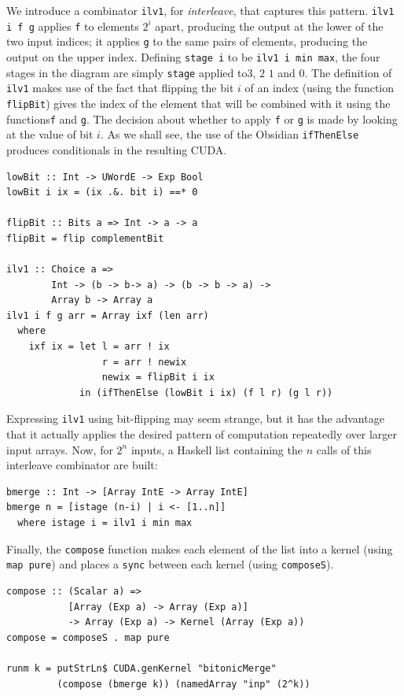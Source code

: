 We introduce a combinator {\tt ilv1}, for {\em interleave}, that captures this pattern.
{\tt ilv1 i f g} applies {\tt f} to elements {\small $2^i$} apart,
producing the output at the lower of the two input indices; it applies {\tt g}
to the same pairs of elements, producing the output on the upper index.
Defining {\tt stage i} to be {\tt ilv1 i min max},
the four stages in the diagram are simply
{\tt stage} applied to{\small  $3$, $2$ $1$} and {\small $0$}.
The definition of {\tt ilv1} makes use of the fact that
flipping the bit $i$ of an index (using
the function {\tt flipBit}) gives the index of the element
that will be combined with it using the functions{\tt f} and {\tt g}.
The decision about whether to apply {\tt f} or {\tt g} is made
by looking at the value of bit $i$.
As we shall see, the use of the Obsidian {\tt ifThenElse}
produces conditionals in the resulting CUDA.
\begin{codesize}
\begin{verbatim}
lowBit :: Int -> UWordE -> Exp Bool
lowBit i ix = (ix .&. bit i) ==* 0

flipBit :: Bits a => Int -> a -> a
flipBit = flip complementBit

ilv1 :: Choice a => 
        Int -> (b -> b-> a) -> (b -> b -> a) -> 
        Array b -> Array a
ilv1 i f g arr = Array ixf (len arr)
  where
    ixf ix = let l = arr ! ix
                 r = arr ! newix
                 newix = flipBit i ix
             in (ifThenElse (lowBit i ix) (f l r) (g l r))
\end{verbatim}
\end{codesize}
\noindent
Expressing {\tt ilv1} using bit-flipping may seem strange, but it has
the advantage that it actually applies the desired pattern of
computation repeatedly over larger input arrays.
Now, for {\small $2^n$} inputs, a Haskell list containing the $n$ calls
of this interleave combinator are built:
\begin{codesize}
\begin{verbatim}
bmerge :: Int -> [Array IntE -> Array IntE]
bmerge n = [istage (n-i) | i <- [1..n]]
  where istage i = ilv1 i min max
\end{verbatim}
\end{codesize}
\noindent
Finally, the {\tt compose} function makes each element of the list
into a kernel (using {\tt map pure}) and places a {\tt sync} between
each kernel (using {\tt composeS}).
\begin{codesize}
\begin{verbatim}
compose :: (Scalar a) => 
           [Array (Exp a) -> Array (Exp a)] 
           -> Array (Exp a) -> Kernel (Array (Exp a))
compose = composeS . map pure

runm k = putStrLn$ CUDA.genKernel "bitonicMerge" 
         (compose (bmerge k)) (namedArray "inp" (2^k))
\end{verbatim}
\end{codesize}
